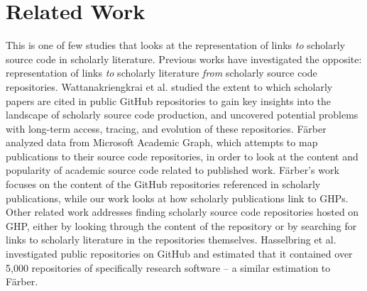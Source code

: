 \chapter{Related Work}
\label{ch:relatedwork}


This is one of few studies that looks at the representation of links \textit{to} scholarly source code in scholarly literature. Previous works have investigated the opposite: representation of links \textit{to} scholarly literature \textit{from} scholarly source code repositories. Wattanakriengkrai et al. \cite{wattanakriengkrai_github_2022} studied the extent to which scholarly papers are cited in public GitHub repositories  to gain key insights into the landscape of scholarly source code production, and uncovered potential problems with long-term access, tracing, and evolution of these repositories. Färber \cite{farber-jcdl2020} analyzed data from Microsoft Academic Graph, which attempts to map publications to their source code repositories, in order to look at the content and popularity of academic source code related to published work. Färber's work focuses on the content of the GitHub repositories referenced in scholarly publications, while our work looks at how scholarly publications link to GHPs. Other related work addresses finding scholarly source code repositories hosted on GHP, either by looking through the content of the repository or by searching for links to scholarly literature in the repositories themselves. Hasselbring et al. \cite{hasselbring} investigated public repositories on GitHub and estimated that it contained over 5,000 repositories of specifically research software -- a similar estimation to Färber.

